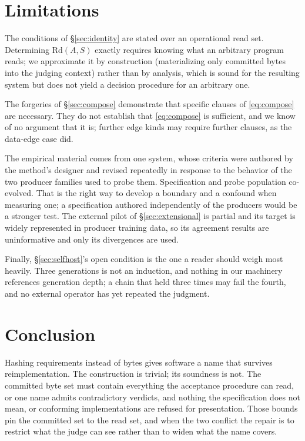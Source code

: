\documentclass[10pt,twocolumn,letterpaper]{article}
\begin{document}
\section{Limitations}
The conditions of §\ref{sec:identity} are stated over an operational read set. Determining $\mathrm{Rd}(A,S)$ exactly requires knowing what an arbitrary program reads; we approximate it by construction (materializing only committed bytes into the judging context) rather than by analysis, which is sound for the resulting system but does not yield a decision procedure for an arbitrary one.

The forgeries of §\ref{sec:compose} demonstrate that specific clauses of \eqref{eq:compose} are necessary. They do not establish that \eqref{eq:compose} is sufficient, and we know of no argument that it is; further edge kinds may require further clauses, as the data-edge case did.

The empirical material comes from one system, whose criteria were authored by the method's designer and revised repeatedly in response to the behavior of the two producer families used to probe them. Specification and probe population co-evolved. That is the right way to develop a boundary and a confound when measuring one; a specification authored independently of the producers would be a stronger test. The external pilot of §\ref{sec:extensional} is partial and its target is widely represented in producer training data, so its agreement results are uninformative and only its divergences are used.

Finally, §\ref{sec:selfhost}'s open condition is the one a reader should weigh most heavily. Three generations is not an induction, and nothing in our machinery references generation depth; a chain that held three times may fail the fourth, and no external operator has yet repeated the judgment.

\section{Conclusion}
Hashing requirements instead of bytes gives software a name that survives reimplementation. The construction is trivial; its soundness is not. The committed byte set must contain everything the acceptance procedure can read, or one name admits contradictory verdicts, and nothing the specification does not mean, or conforming implementations are refused for presentation. Those bounds pin the committed set to the read set, and when the two conflict the repair is to restrict what the judge can see rather than to widen what the name covers.
\end{document}
